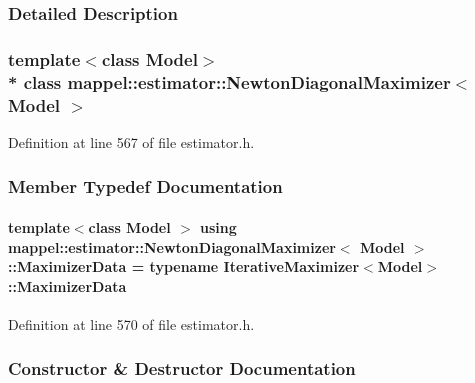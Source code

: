 \subsubsection{Detailed Description}
\subsubsection*{template$<$class Model$>$\\*
class mappel\+::estimator\+::\+Newton\+Diagonal\+Maximizer$<$ Model $>$}



Definition at line 567 of file estimator.\+h.



\subsubsection{Member Typedef Documentation}
\paragraph[{\texorpdfstring{Maximizer\+Data}{MaximizerData}}]{\setlength{\rightskip}{0pt plus 5cm}template$<$class Model $>$ using {\bf mappel\+::estimator\+::\+Newton\+Diagonal\+Maximizer}$<$ Model $>$\+::{\bf Maximizer\+Data} =  typename {\bf Iterative\+Maximizer}$<$Model$>$\+::{\bf Maximizer\+Data}}\hypertarget{classmappel_1_1estimator_1_1NewtonDiagonalMaximizer_a57a1b340973904d7131560d66c4f3236}{}\label{classmappel_1_1estimator_1_1NewtonDiagonalMaximizer_a57a1b340973904d7131560d66c4f3236}


Definition at line 570 of file estimator.\+h.



\subsubsection{Constructor \& Destructor Documentation}
